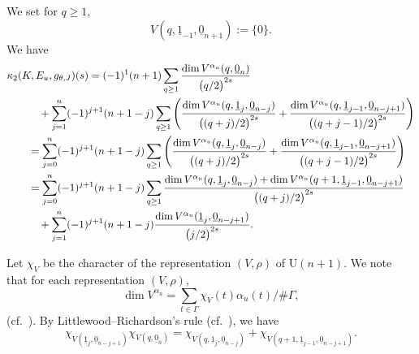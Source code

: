 \documentclass[10pt,a4paper]{amsart}
\numberwithin{equation}{section}
\DeclareMathOperator{\Tr}{Tr}
\begin{document}
We set for $q \geq 1$,
\[
 V ( q, \underline{1}_{-1} ,\underline{0}_{n+1} )
 := \{ 0 \}
 .
\]
We have
\begin{align}
 & \kappa_{2} (K, E_{u} , g_{\theta , J} ) (s)
 =
 (-1 )^{1} (n+1)
 \sum_{q \geq 1 }
 \frac{
 \dim V^{\alpha_u} ( q, \underline{0}_{n} )
 }{
 \bigl( q /2 \bigr)^{2s}
 }
 \notag
 \\
 & \qquad\quad{}+
 \sum_{j=1}^{n}
 (-1 )^{j+1} (n+1-j)
 \sum_{q \geq 1 }
 \left(
 \frac{
 \dim V^{\alpha_u} ( q, \underline{1}_{j} ,\underline{0}_{n-j} )
 }{
 \bigl( ( q+j)/2 \bigr)^{2s}
 }
 +
 \frac{
 \dim V^{\alpha_u} ( q, \underline{1}_{j-1} ,\underline{0}_{n-j+1} )
 }{
 \bigl( (q+j-1)/2 \bigr)^{2s}
 }
 \right)
 \notag
 \\
 &\qquad{}=
 \sum_{j=0}^{n}
 (-1 )^{j+1} (n+1-j)
 \sum_{q \geq 1 }
 \left(
 \frac{
 \dim V^{\alpha_u} ( q, \underline{1}_{j} ,\underline{0}_{n-j} )
 }{
 \bigl( ( q+j)/2 \bigr)^{2s}
 }
 +
 \frac{
 \dim V^{\alpha_u} ( q, \underline{1}_{j-1} ,\underline{0}_{n-j+1} )
 }{
 \bigl( (q+j-1)/2 \bigr)^{2s}
 }
 \right)
 \notag
 \\
 &\qquad{}=
 \sum_{j=0}^{n}
 (-1 )^{j+1} (n+1-j)
 \sum_{q \geq 1 }
 \frac{
 \dim V^{\alpha_u} ( q, \underline{1}_{j} ,\underline{0}_{n-j} )
 +
 \dim V^{\alpha_u} ( q+1, \underline{1}_{j-1} ,\underline{0}_{n-j+1} )
 }{
 \bigl( (q+j)/2 \bigr)^{2s}
 }
 \notag
 \\
 & \qquad\quad{}
 +
 \sum_{j=1}^{n}
 (-1 )^{j+1} (n+1-j)
 \frac{
 \dim V^{\alpha_u} ( \underline{1}_{j} ,\underline{0}_{n-j+1} )
 }{
 \bigl( j/2 \bigr)^{2s}
 }
 .
 \notag
\end{align}

Let $\chi_V$ be the character of the representation $(V, \rho)$ of $ \mathrm{U} (n+1)$.
We note that for each representation $(V,\rho)$,
\[
 \dim V^{\alpha_u}
 = \sum_{t \in \Gamma } \chi_{V} ( t ) \alpha_u ( t ) / \# \Gamma
 ,
\]
(cf.~\cite[equation~(2.9)]{Fulton-Harris-04}).
By Littlewood--Richardson's rule (cf.~\cite[Corollary~3]{Fulton-97}), we have
\begin{equation}
 \chi_{V ( \underline{1}_{j} ,\underline{0}_{n-j+1} )}
 \chi_{V ( q, \underline{0}_{n} )}
 =
 \chi_{V ( q, \underline{1}_{j} ,\underline{0}_{n-j} )}
 +
 \chi_{V ( q+1, \underline{1}_{j-1} ,\underline{0}_{n-j+1} )}
 .
 \label{eq:Rich-Litt}
\end{equation}
\end{document}

